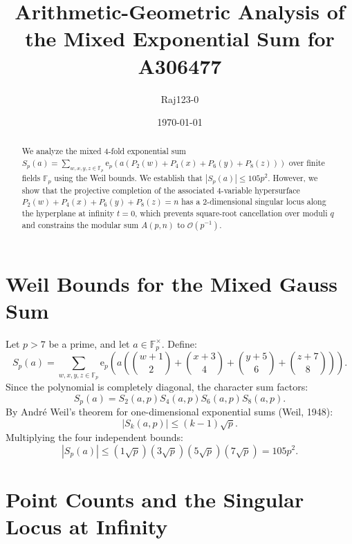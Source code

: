 \documentclass[11pt,reqno]{amsart}
\title{Arithmetic-Geometric Analysis of the Mixed Exponential Sum for A306477}
\author{Raj123-0}
\date{\today}
\newcommand{\e}{\mathrm{e}}
\newcommand{\F}{\mathbb{F}}
\begin{document}
\maketitle

\begin{abstract}
We analyze the mixed 4-fold exponential sum $S_p(a) = \sum_{w,x,y,z \in \F_p} \e_p(a(P_2(w)+P_4(x)+P_6(y)+P_8(z)))$ over finite fields $\F_p$ using the Weil bounds. We establish that $|S_p(a)| \le 105 p^2$. However, we show that the projective completion of the associated 4-variable hypersurface $P_2(w)+P_4(x)+P_6(y)+P_8(z) = n$ has a 2-dimensional singular locus along the hyperplane at infinity $t=0$, which prevents square-root cancellation over moduli $q$ and constrains the modular sum $A(p, n)$ to $\mathcal{O}(p^{-1})$.
\end{abstract}

\section{Weil Bounds for the Mixed Gauss Sum}

Let $p > 7$ be a prime, and let $a \in \F_p^\times$. Define:
\begin{equation}
    S_p(a) = \sum_{w,x,y,z \in \F_p} \e_p\left(a \left(\binom{w+1}{2} + \binom{x+3}{4} + \binom{y+5}{6} + \binom{z+7}{8}\right)\right).
\end{equation}
Since the polynomial is completely diagonal, the character sum factors:
\begin{equation}
    S_p(a) = S_2(a, p) S_4(a, p) S_6(a, p) S_8(a, p).
\end{equation}
By André Weil's theorem for one-dimensional exponential sums (Weil, 1948):
\begin{equation}
    |S_k(a, p)| \le (k - 1) \sqrt{p}.
\end{equation}
Multiplying the four independent bounds:
\begin{equation}
    |S_p(a)| \le (1 \sqrt{p})(3 \sqrt{p})(5 \sqrt{p})(7 \sqrt{p}) = 105 p^2.
\end{equation}

\section{Point Counts and the Singular Locus at Infinity}
\end{document}
